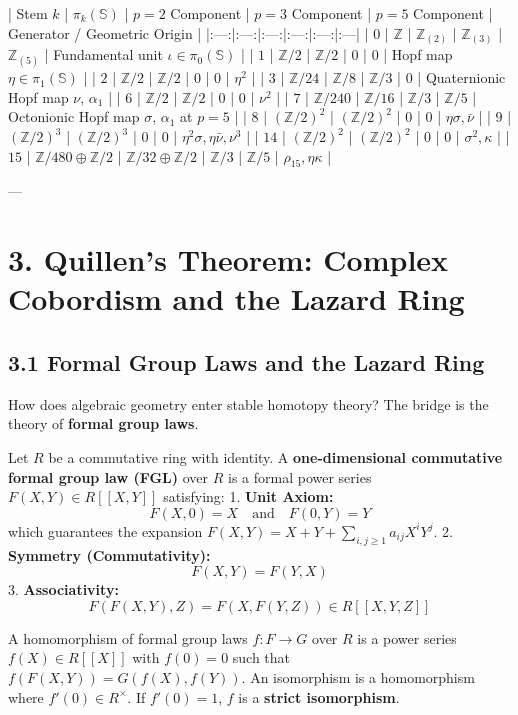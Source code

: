 \documentclass[11pt,twoside,openright]{amsbook}
\begin{document}
{{| Stem $k$ | $\pi_k(\mathbb{S})$ | $p=2$ Component | $p=3$ Component | $p=5$ Component | Generator / Geometric Origin |
|:---:|:---:|:---:|:---:|:---:|:---|
| $0$ | $\mathbb{Z}$ | $\mathbb{Z}_{(2)}$ | $\mathbb{Z}_{(3)}$ | $\mathbb{Z}_{(5)}$ | Fundamental unit $\iota \in \pi_0(\mathbb{S})$ |
| $1$ | $\mathbb{Z}/2$ | $\mathbb{Z}/2$ | $0$ | $0$ | Hopf map $\eta \in \pi_1(\mathbb{S})$ |
| $2$ | $\mathbb{Z}/2$ | $\mathbb{Z}/2$ | $0$ | $0$ | $\eta^2$ |
| $3$ | $\mathbb{Z}/24$ | $\mathbb{Z}/8$ | $\mathbb{Z}/3$ | $0$ | Quaternionic Hopf map $\nu$, $\alpha_1$ |
| $6$ | $\mathbb{Z}/2$ | $\mathbb{Z}/2$ | $0$ | $0$ | $\nu^2$ |
| $7$ | $\mathbb{Z}/240$ | $\mathbb{Z}/16$ | $\mathbb{Z}/3$ | $\mathbb{Z}/5$ | Octonionic Hopf map $\sigma$, $\alpha_1$ at $p=5$ |
| $8$ | $(\mathbb{Z}/2)^2$ | $(\mathbb{Z}/2)^2$ | $0$ | $0$ | $\eta\sigma, \bar{\nu}$ |
| $9$ | $(\mathbb{Z}/2)^3$ | $(\mathbb{Z}/2)^3$ | $0$ | $0$ | $\eta^2\sigma, \eta\bar{\nu}, \nu^3$ |
| $14$ | $(\mathbb{Z}/2)^2$ | $(\mathbb{Z}/2)^2$ | $0$ | $0$ | $\sigma^2, \kappa$ |
| $15$ | $\mathbb{Z}/480 \oplus \mathbb{Z}/2$ | $\mathbb{Z}/32 \oplus \mathbb{Z}/2$ | $\mathbb{Z}/3$ | $\mathbb{Z}/5$ | $\rho_{15}, \eta\kappa$ |

---

\section{3. Quillen’s Theorem: Complex Cobordism and the Lazard Ring}

\subsection{3.1 Formal Group Laws and the Lazard Ring}
How does algebraic geometry enter stable homotopy theory? The bridge is the theory of \textbf{formal group laws}.

Let $R$ be a commutative ring with identity. A \textbf{one-dimensional commutative formal group law (FGL)} over $R$ is a formal power series $F(X, Y) \in R[[X, Y]]$ satisfying:
1. \textbf{Unit Axiom:}
   $$F(X, 0) = X \quad \text{and} \quad F(0, Y) = Y$$
   which guarantees the expansion $F(X, Y) = X + Y + \sum_{i, j \geq 1} a_{ij} X^i Y^j$.
2. \textbf{Symmetry (Commutativity):}
   $$F(X, Y) = F(Y, X)$$
3. \textbf{Associativity:}
   $$F(F(X, Y), Z) = F(X, F(Y, Z)) \in R[[X, Y, Z]]$$

A homomorphism of formal group laws $f: F \to G$ over $R$ is a power series $f(X) \in R[[X]]$ with $f(0) = 0$ such that $f(F(X, Y)) = G(f(X), f(Y))$. An isomorphism is a homomorphism where $f'(0) \in R^\times$. If $f'(0) = 1$, $f$ is a \textbf{strict isomorphism}.

}}
\end{document}
